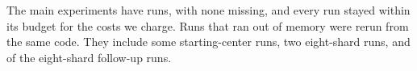 The main experiments have \RNumTotalMainRuns{} runs, with none missing, and every run stayed within its budget for the costs we charge.
Runs that ran out of memory were rerun from the same code.
They include some starting-center runs, two eight-shard runs, and \RNumAddThreeMThreeFailedAttempts{} of the \RNumAddThreeMThreeRuns{} eight-shard follow-up runs.
